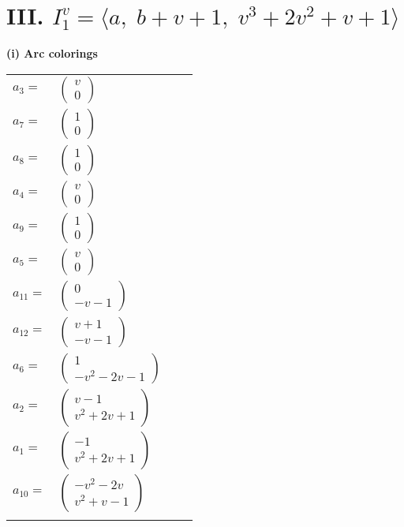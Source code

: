 \documentclass[1p]{elsarticle_modified}
\theoremstyle{definition}
\begin{document}
\centering \section*{III. $I^v_{1}= \langle a,\;b+v+1,\;v^3+2 v^2+v+1 \rangle$}
\flushleft \textbf{(i) Arc colorings}\\
\begin{tabular}{m{7pt} m{180pt} m{7pt} m{180pt} }
\flushright $a_{3}=$&$\begin{pmatrix}v\\0\end{pmatrix}$ \\
\flushright $a_{7}=$&$\begin{pmatrix}1\\0\end{pmatrix}$ \\
\flushright $a_{8}=$&$\begin{pmatrix}1\\0\end{pmatrix}$ \\
\flushright $a_{4}=$&$\begin{pmatrix}v\\0\end{pmatrix}$ \\
\flushright $a_{9}=$&$\begin{pmatrix}1\\0\end{pmatrix}$ \\
\flushright $a_{5}=$&$\begin{pmatrix}v\\0\end{pmatrix}$ \\
\flushright $a_{11}=$&$\begin{pmatrix}0\\- v-1\end{pmatrix}$ \\
\flushright $a_{12}=$&$\begin{pmatrix}v+1\\- v-1\end{pmatrix}$ \\
\flushright $a_{6}=$&$\begin{pmatrix}1\\- v^2-2 v-1\end{pmatrix}$ \\
\flushright $a_{2}=$&$\begin{pmatrix}v-1\\v^2+2 v+1\end{pmatrix}$ \\
\flushright $a_{1}=$&$\begin{pmatrix}-1\\v^2+2 v+1\end{pmatrix}$ \\
\flushright $a_{10}=$&$\begin{pmatrix}- v^2-2 v\\v^2+v-1\end{pmatrix}$\\&\end{tabular}
\end{document}
